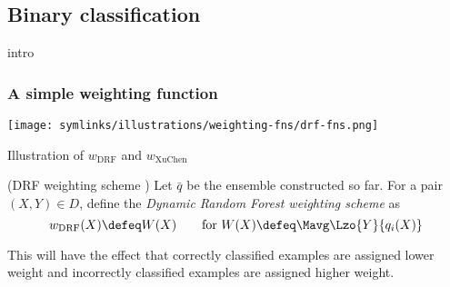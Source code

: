 \documentclass[../main.tex]{subfiles}
\begin{document}


\subsection{Binary classification}

intro

\subsubsection{A simple weighting function}

\begin{marginfigure}
    \texttt{[image: symlinks/illustrations/weighting-fns/drf-fns.png]}
    \caption{Illustration of $w_{\text{DRF}}$ and $w_{\text{XuChen}}$}
\end{marginfigure}
\begin{definition} (DRF weighting scheme \cite{bernard_DynamicRandomForests_2012})
Let $\bar{q}$ be the ensemble constructed so far. For a pair $(X,Y) \in D$, define the \textit{Dynamic Random Forest weighting scheme} as 
$$
w_{\text{DRF}}(X) \defeq W(X)
\hspace{2em} \text{for~}  W(X) \defeq \Mavg \Lzo{Y}{q_i(X)}
$$
\label{def:drf-weighting-scheme}
\end{definition}
This will have the effect that correctly classified examples are assigned lower weight and incorrectly classified examples are assigned higher weight.  %

\end{document}
